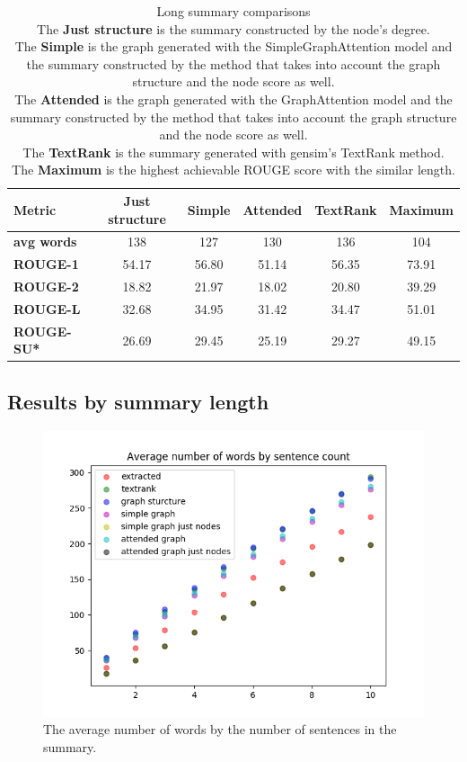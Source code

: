 \begin{table}[!ht]
	\centering
	\begin{tabular}{| l | c | c | c | c | c |}
		\hline
		\textbf{Metric}&\textbf{Just structure}&\textbf{Simple}&\textbf{Attended}&\textbf{TextRank}&\textbf{Maximum} \\ \hline \hline
		\textbf{avg words}&138&127&130&136&104 \\ \hline
		\textbf{ROUGE-1}&54.17&56.80&51.14&56.35&73.91 \\ \hline
		\textbf{ROUGE-2}&18.82&21.97&18.02&20.80&39.29 \\ \hline
		\textbf{ROUGE-L}&32.68&34.95&31.42&34.47&51.01 \\ \hline
		\textbf{ROUGE-SU*}&26.69&29.45&25.19&29.27&49.15 \\ \hline
	\end{tabular}
	\caption{Long summary comparisons \\ The \textbf{Just structure} is the summary constructed by the node's degree. \\ The \textbf{Simple} is the graph generated with the SimpleGraphAttention model and the summary constructed by the method that takes into account the graph structure and the node score as well. \\ The \textbf{Attended} is the graph generated with the GraphAttention model and the summary constructed by the method that takes into account the graph structure and the node score as well. \\ The \textbf{TextRank} is the summary generated with gensim's TextRank method. \\ The \textbf{Maximum} is the highest achievable ROUGE score with the similar length.}
	\label{tab:long}
\end{table}

\FloatBarrier
\subsection{Results by summary length}

\begin{figure}[!ht]
	\centering
	\includegraphics[width=150mm, keepaspectratio]{figures/word_counts.png}
	\caption{The average number of words by the number of sentences in the summary.}
	\label{fig:word_count}
\end{figure}

